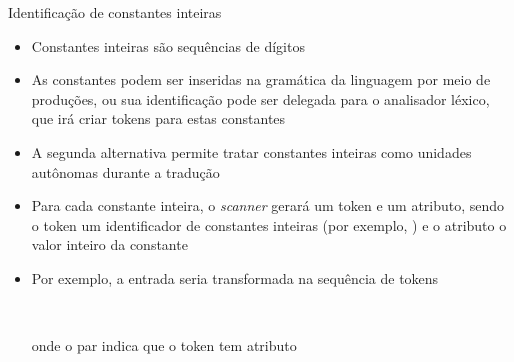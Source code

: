 \begin{frame}[fragile]{Identificação de constantes inteiras}

    \begin{itemize}
        \item Constantes inteiras são sequências de dígitos

        \item As constantes podem ser inseridas na gramática da linguagem por meio de produções, ou sua identificação pode ser delegada para o analisador léxico,
            que irá criar tokens para estas constantes

        \item A segunda alternativa permite tratar constantes inteiras como unidades autônomas durante a tradução

        \item Para cada constante inteira, o \textit{scanner} gerará um token e um atributo, sendo o token um identificador de constantes inteiras (por exemplo,
            ) e o atributo o valor inteiro da constante

        \item Por exemplo, a entrada  seria transformada na sequência de tokens
        \begin{center}
            \ \ \ \ \ \ \ \ \ \ \ \ \ \ \ \  
        \end{center}
        onde o par  indica que o token  tem atributo 
    \end{itemize}

\end{frame}

